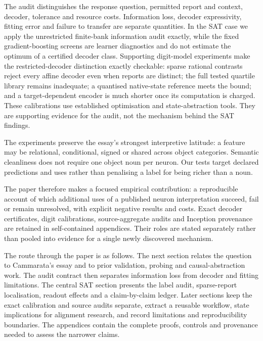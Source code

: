 \documentclass[
  british,
  11pt,
  a4paper,
]{article}
\begin{document}
The audit distinguishes the response question, permitted report and
context, decoder, tolerance and resource costs. Information loss,
decoder expressivity, fitting error and failure to transfer are separate
quantities. In the SAT case we apply the unrestricted finite-bank
information audit exactly, while the fixed gradient-boosting screens are
learner diagnostics and do not estimate the optimum of a certified
decoder class. Supporting digit-model experiments make the
restricted-decoder distinction exactly checkable: sparse rational
contrasts reject every affine decoder even when reports are distinct;
the full tested quartile library remains inadequate; a quantised
native-state reference meets the bound; and a target-dependent encoder
is much shorter once its computation is charged. These calibrations use
established optimisation and state-abstraction tools. They are
supporting evidence for the audit, not the mechanism behind the SAT
findings.

The experiments preserve the essay's strongest interpretive latitude: a
feature may be relational, conditional, signed or shared across object
categories. Semantic cleanliness does not require one object noun per
neuron. Our tests target declared predictions and uses rather than
penalising a label for being richer than a noun.

The paper therefore makes a focused empirical contribution: a
reproducible account of which additional uses of a published neuron
interpretation succeed, fail or remain unresolved, with explicit
negative results and costs. Exact decoder certificates, digit
calibrations, source-aggregate audits and Inception provenance are
retained in self-contained appendices. Their roles are stated separately
rather than pooled into evidence for a single newly discovered
mechanism.

The route through the paper is as follows. The next section relates the
question to Cammarata's essay and to prior validation, probing and
causal-abstraction work. The audit contract then separates information
loss from decoder and fitting limitations. The central SAT section
presents the label audit, sparse-report localisation, readout effects
and a claim-by-claim ledger. Later sections keep the exact calibration
and source audits separate, extract a reusable workflow, state
implications for alignment research, and record limitations and
reproducibility boundaries. The appendices contain the complete proofs,
controls and provenance needed to assess the narrower claims.
\end{document}

